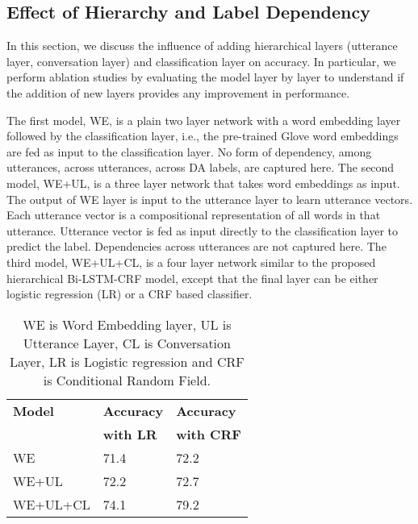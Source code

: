 \documentclass[letterpaper]{article} \usepackage{aaai18}
\begin{document}
\subsection{Effect of Hierarchy and Label Dependency}
In this section, we discuss the influence of adding hierarchical layers (utterance layer, conversation layer) and classification layer on accuracy. In particular, we perform ablation studies by evaluating the model layer by layer to understand if the addition of new layers provides any improvement in performance.

The first model, WE, is a plain two layer network with a word embedding layer followed by the classification layer, i.e., the pre-trained Glove word embeddings are fed as input to the classification layer. No form of dependency, among utterances, across utterances, across DA labels, are captured here. The second model, WE+UL, is a three layer network that takes word embeddings as input. The output of WE layer is input to the utterance layer to learn utterance vectors. Each utterance vector is a compositional representation of all words in that utterance. Utterance vector is fed as input directly to the classification layer to predict the label. Dependencies across utterances are not captured here. The third model, WE+UL+CL, is a four layer network similar to the proposed hierarchical Bi-LSTM-CRF model, except that the final layer can be either logistic regression (LR) or a CRF based classifier. 
\begin{table}[!htb]
  \centering
  \small
  \begin{tabular}{|l|l|l|}
    \hline
    \textbf{Model}	& \textbf{Accuracy} & \textbf{Accuracy} \\
                    & \textbf{with LR} 	& \textbf{with CRF}	\\\hline
    WE 				& 71.4				& 72.2 				\\
    WE+UL 			& 72.2 				& 72.7				\\
    WE+UL+CL 		& 74.1 				& 79.2				\\
    \hline
  \end{tabular}
  \caption{WE is Word Embedding layer, UL is Utterance Layer, CL is Conversation Layer, LR is Logistic regression and CRF is Conditional Random Field.}
  \label{table:journey}
\end{table}
\end{document}
